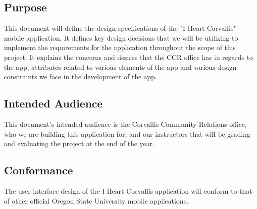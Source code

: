\documentclass[draftclsnofoot, onecolumn, 10pt, compsoc]{IEEEtran}
\begin{document}
		\subsection{Purpose}
			This document will define the design specifications of the "I Heart Corvallis" mobile application. It defines key design decisions that we will be utilizing to implement the requirements for the application throughout the scope of this project. It explains the concerns and desires that the CCR office has in regards to the app, attributes related to various elements of the app and various design constraints we face in the development of the app.
		\subsection{Intended Audience}
			This document's intended audience is the Corvallis Community Relations office, who we are building this application for, and our instructors that will be grading and evaluating the project at the end of the year.
		\subsection{Conformance}
			The user interface design of the I Heart Corvallis application will conform to that of other official Oregon State University mobile applications.
		\newpage
\end{document}
